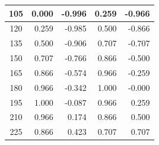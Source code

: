 \begin{table}[htbp]
\begin{center}
\begin{tabular}{|p{20mm}|p{20mm}|p{20mm}|p{20mm}|p{20mm}|}
      \multicolumn{1}{|c|}{105}                      & \multicolumn{1}{|r|}{0.000}                                  & \multicolumn{1}{|r|}{-0.996}                                 & \multicolumn{1}{|r|}{0.259}                & \multicolumn{1}{|r|}{-0.966}               \\ \hline
      \multicolumn{1}{|c|}{120}                      & \multicolumn{1}{|r|}{0.259}                                  & \multicolumn{1}{|r|}{-0.985}                                 & \multicolumn{1}{|r|}{0.500}                & \multicolumn{1}{|r|}{-0.866}               \\ \hline
      \multicolumn{1}{|c|}{135}                      & \multicolumn{1}{|r|}{0.500}                                  & \multicolumn{1}{|r|}{-0.906}                                 & \multicolumn{1}{|r|}{0.707}                & \multicolumn{1}{|r|}{-0.707}               \\ \hline
      \multicolumn{1}{|c|}{150}                      & \multicolumn{1}{|r|}{0.707}                                  & \multicolumn{1}{|r|}{-0.766}                                 & \multicolumn{1}{|r|}{0.866}                & \multicolumn{1}{|r|}{-0.500}               \\ \hline
      \multicolumn{1}{|c|}{165}                      & \multicolumn{1}{|r|}{0.866}                                  & \multicolumn{1}{|r|}{-0.574}                                 & \multicolumn{1}{|r|}{0.966}                & \multicolumn{1}{|r|}{-0.259}               \\ \hline
      \multicolumn{1}{|c|}{180}                      & \multicolumn{1}{|r|}{0.966}                                  & \multicolumn{1}{|r|}{-0.342}                                 & \multicolumn{1}{|r|}{1.000}                & \multicolumn{1}{|r|}{-0.000}               \\ \hline
      \multicolumn{1}{|c|}{195}                      & \multicolumn{1}{|r|}{1.000}                                  & \multicolumn{1}{|r|}{-0.087}                                 & \multicolumn{1}{|r|}{0.966}                & \multicolumn{1}{|r|}{0.259}                \\ \hline
      \multicolumn{1}{|c|}{210}                      & \multicolumn{1}{|r|}{0.966}                                  & \multicolumn{1}{|r|}{0.174}                                  & \multicolumn{1}{|r|}{0.866}                & \multicolumn{1}{|r|}{0.500}                \\ \hline
      \multicolumn{1}{|c|}{225}                      & \multicolumn{1}{|r|}{0.866}                                  & \multicolumn{1}{|r|}{0.423}                                  & \multicolumn{1}{|r|}{0.707}                & \multicolumn{1}{|r|}{0.707}                \\ \hline

\end{tabular}
\end{center}
\end{table}
